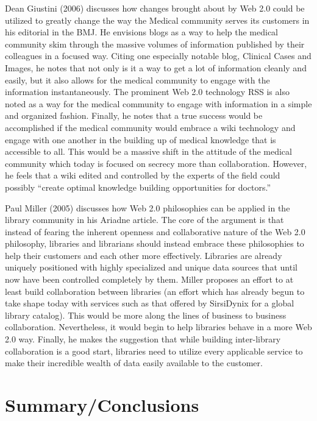 \documentclass[12pt,oneside,letterpaper]{article}
\begin{document}
Dean Giustini (2006) discusses how changes brought about by Web 2.0 could be
utilized to greatly change the way the Medical community serves its customers in
his editorial in the BMJ.  He envisions blogs as a way to help the medical
community skim through the massive volumes of information published by their
colleagues in a focused way.  Citing one especially notable blog, Clinical Cases
and Images, he notes that not only is it a way to get a lot of information
cleanly and easily, but it also allows for the medical community to engage with
the information instantaneously.  The prominent Web 2.0 technology RSS is also
noted as a way for the medical community to engage with information in a simple
and organized fashion.  Finally, he notes that a true success would be
accomplished if the medical community would embrace a wiki technology and engage
with one another in the building up of medical knowledge that is accessible to
all.  This would be a massive shift in the attitude of the medical community
which today is focused on secrecy more than collaboration.  However, he feels
that a wiki edited and controlled by the experts of the field could possibly
``create optimal knowledge building opportunities for doctors.''

Paul Miller (2005) discusses how Web 2.0 philosophies can be applied in the library
community in his Ariadne article.  The core of the argument is that
instead of fearing the inherent openness and collaborative nature of the Web 2.0
philosophy, libraries and librarians should instead embrace these philosophies
to help their customers and each other more effectively.  Libraries are already
uniquely positioned with highly specialized and unique data sources that until
now have been controlled completely by them.  Miller proposes an effort to at
least build collaboration between libraries (an effort which has already begun
to take shape today with services such as that offered by SirsiDynix for a
global library catalog).  This would be more along the lines of business
to business collaboration.  Nevertheless, it would begin to help libraries
behave in a more Web 2.0 way.  Finally, he makes the suggestion that while
building inter-library collaboration is a good start, libraries need to utilize
every applicable service to make their incredible wealth of data easily
available to the customer.

\section{Summary/Conclusions}
\end{document}
